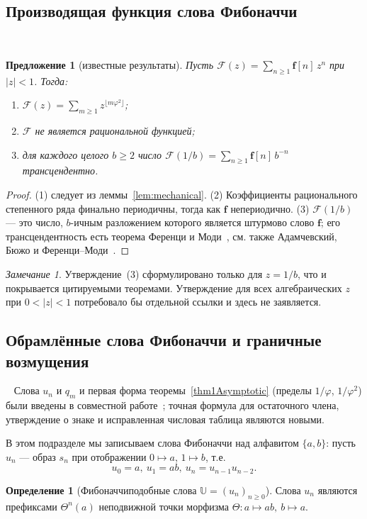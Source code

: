 \documentclass[a4paper,14pt]{extreport}
\theoremstyle{plain}
\newtheorem{proposition}[theorem]{Предложение}
\theoremstyle{definition}
\newtheorem{definition}{Определение}[section]
\theoremstyle{remark}
\newtheorem{remark}{Замечание}
\begin{document}
\subsection{Производящая функция слова Фибоначчи}~\label{sec3.5.3}
\begin{proposition}[известные результаты]\label{sec2:proposition1}
	Пусть $\mathcal F(z)=\sum_{n\ge1}\mathbf f[n]\,z^n$ при $|z|<1$. Тогда:
	\begin{enumerate}
		\item $\mathcal F(z)=\sum_{m\ge1}z^{\lfloor m\varphi^2\rfloor}$;
		\item $\mathcal F$ не является рациональной функцией;
		\item для каждого целого $b\ge2$ число $\mathcal F(1/b)=\sum_{n\ge1}\mathbf f[n]\,b^{-n}$ трансцендентно.
	\end{enumerate}
\end{proposition}

\begin{proof}
	(1) следует из леммы~\ref{lem:mechanical}. (2) Коэффициенты рационального степенного ряда финально периодичны,
	тогда как $\mathbf f$ непериодично. (3) $\mathcal F(1/b)$ --- это число, $b$-ичным разложением которого является штурмово слово $\mathbf f$;
	его трансцендентность есть теорема Ференци и Моди~\cite{Ferenczi}, см. также Адамчевский, Бюжо и Ференци–Моди~\cite{AdamczewskiB2007,Fogg}.
\end{proof}

\begin{remark}
	Утверждение~(3) сформулировано только для $z=1/b$, что и покрывается цитируемыми теоремами. Утверждение для всех алгебраических $z$ при $0<|z|<1$
	потребовало бы отдельной ссылки и здесь не заявляется.
\end{remark}
\subsection{Обрамлённые слова Фибоначчи и граничные возмущения}~\label{sec3.5.4}
Слова $u_n$ и $q_m$ и первая форма теоремы~\ref{thm1Asymptotic} (пределы $1/\varphi$, $1/\varphi^2$) были введены в совместной работе~\cite{HamoudAbdullah}; точная формула для остаточного члена, утверждение о знаке и исправленная числовая таблица являются новыми.

В этом подразделе мы записываем слова Фибоначчи над алфавитом $\{a,b\}$: пусть $u_n$ --- образ $s_n$ при отображении $0\mapsto a$, $1\mapsto b$, т.е.\
\begin{equation}\label{eq1defnewwordn1}
	u_0=a,\ u_1=ab,\ u_n=u_{n-1}u_{n-2}.
\end{equation}
\begin{definition}[Фибоначчиподобные слова $\mathbb U=(u_n)_{n\ge0}$]\label{defnewwordn1}
	Слова $u_n$ являются префиксами $\Theta^n(a)$ неподвижной точки морфизма $\Theta\colon a\mapsto ab,\ b\mapsto a$.
\end{definition}
\end{document}

